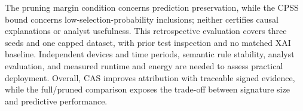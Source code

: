 The pruning margin condition concerns prediction preservation,
while the CPSS bound concerns low-selection-probability inclusions;
neither certifies causal explanations or analyst usefulness.
This retrospective evaluation covers three seeds and one capped
dataset, with prior test inspection and no matched XAI baseline.
Independent devices and time periods, semantic rule stability,
analyst evaluation, and measured runtime and energy are needed to
assess practical deployment. Overall, CAS improves attribution with
traceable signed evidence, while the full/pruned comparison exposes
the trade-off between signature size and predictive performance.

\clearpage


